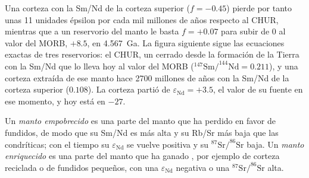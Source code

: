 Una corteza con la Sm/Nd de la corteza superior ($f = -0.45$) pierde por tanto unas
11 unidades épsilon por cada mil millones de años respecto al CHUR, mientras que a un reservorio del manto
le basta $f = +0.07$ para subir de 0 al valor del MORB, $+8.5$, en
\qty{4.567}{Ga}. La figura siguiente sigue las ecuaciones exactas de tres
reservorios: el CHUR, un  cerrado desde la formación de la Tierra con la Sm/Nd
que lo lleva hoy al valor del MORB ($^{147}\mathrm{Sm}/^{144}\mathrm{Nd} =
0.211$), y una corteza extraída de ese manto hace 2700 millones de años con la
Sm/Nd de la corteza superior ($0.108$). La corteza partió de $\varepsilon_{\mathrm{Nd}} =
+3.5$, el valor de su fuente en ese momento, y hoy está en $-27$.

\begin{definition}\label{def:b2:isotope-geochemistry:reservoirs}
Un \emph{manto empobrecido} es una parte del manto que ha
perdido  en favor de fundidos, de modo que su Sm/Nd es más alta y su Rb/Sr
más baja que las condríticas; con el tiempo su $\varepsilon_{\mathrm{Nd}}$ se vuelve positiva y
su $^{87}\mathrm{Sr}/^{86}\mathrm{Sr}$ baja. Un \emph{manto
enriquecido} es una parte del manto que ha ganado
, por ejemplo de corteza reciclada o de fundidos pequeños,
con una $\varepsilon_{\mathrm{Nd}}$ negativa o una $^{87}\mathrm{Sr}/^{86}\mathrm{Sr}$ alta.
\end{definition}

